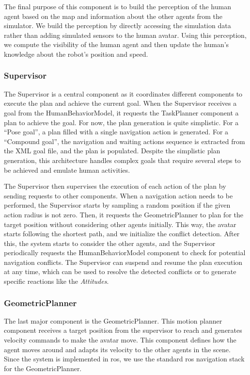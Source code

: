 The final purpose of this component is to build the perception of the human agent based on the map and information about the other agents from the simulator. We build the perception by directly accessing the simulation data rather than adding simulated sensors to the human avatar. Using this perception, we compute the visibility of the human agent and then update the human's knowledge about the robot's position and speed.

\subsubsection{Supervisor}
The Supervisor is a central component as it coordinates different components to execute the plan and achieve the current goal. When the Supervisor receives a goal from the HumanBehaviorModel, it requests the TaskPlanner component a plan to achieve the goal. For now, the plan generation is quite simplistic. For a ``Pose goal'', a plan filled with a single navigation action is generated. For a ``Compound goal'', the navigation and waiting actions sequence is extracted from the XML goal file, and the plan is populated. Despite the simplistic plan generation, this architecture handles complex goals that require several steps to be achieved and emulate human activities.  

The Supervisor then supervises the execution of each action of the plan by sending requests to other components. 
When a navigation action needs to be performed, the Supervisor starts by sampling a random position if the given action radius is not zero. Then, it requests the GeometricPlanner to plan for the target position without considering other agents initially. This way, the avatar starts following the shortest path, and we initialize the conflict detection. After this, the system starts to consider the other agents, and the Supervisor periodically requests the HumanBehaviorModel component to check for potential navigation conflicts. The Supervisor can suspend and resume the plan execution at any time, which can be used to resolve the detected conflicts or to generate specific reactions like the \textit{Attitudes}.

\subsubsection{GeometricPlanner}

The last major component is the GeometricPlanner. This motion planner component receives a target position from the supervisor to reach and generates velocity commands to make the avatar move. This component defines how the agent moves around and adapts its velocity to the other agents in the scene. Since the system is implemented in \acrshort{ros}, we use the standard \acrshort{ros} navigation stack for the GeometricPlanner.

